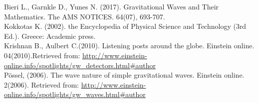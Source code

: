 \documentclass[11]{article}
\begin{document}
     \setlength{\parindent}{5ex} 
     
     \indent Bieri L., Garnkle D., Yunes N. (2017). Gravitational Waves and Their Mathematics. The AMS NOTICES. 64(07), 693-707.\\

      Kokkotas K. (2002). the Encyclopedia of Physical Science and Technology (3rd Ed.). Greece: Academic press.\\

      Krishnan B., Aulbert C.(2010). Listening posts around the globe. Einstein online. 04(2010).Retrieved from: \url{http://www.einstein-online.info/spotlights/gw_detectors.html#author}\\

      Pössel, (2006).  The wave nature of simple gravitational waves. Einstein online. 2(2006). Retrieved from: \url{http://www.einstein-online.info/spotlights/gw_waves.html#author}\\
\end{document}
